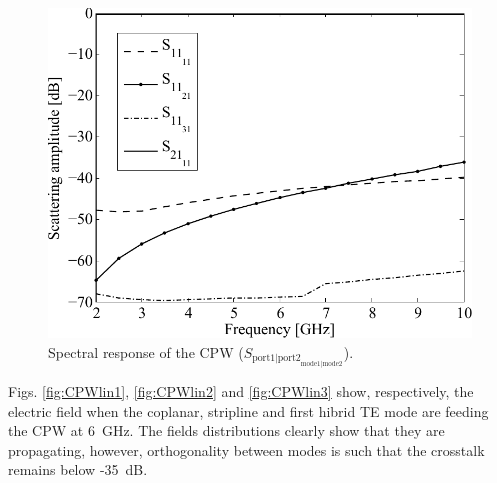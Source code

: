 \begin{figure}[ht!]
\centering
\includegraphics[width=12cm]{CPWlinScat}
\caption{Spectral response of the CPW ($S_{{\text{port1|port2}}_{\text{mode1|mode2}}}$). }
\label{fig:Scattering}
\end{figure}
%

Figs. \ref{fig:CPWlin1}, \ref{fig:CPWlin2} and \ref{fig:CPWlin3} show, respectively, the electric field when the coplanar, stripline and first hibrid TE mode are feeding the CPW at 6~GHz. The fields distributions clearly show that they are propagating, however, orthogonality between modes is such that the crosstalk remains below -35~dB.

